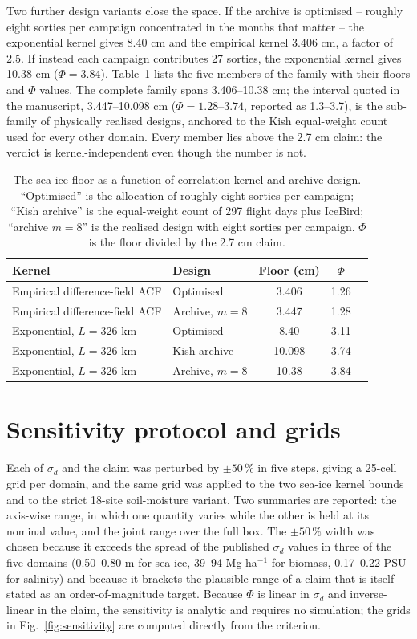 \documentclass[preprint,12pt,authoryear]{elsarticle}
\begin{document}
Two further design variants close the space. If the archive is optimised -- roughly eight sorties per campaign concentrated in the months that matter -- the exponential kernel gives 8.40 cm and the empirical kernel 3.406 cm, a factor of 2.5. If instead each campaign contributes 27 sorties, the exponential kernel gives 10.38 cm ($\Phi = 3.84$). Table~\ref{tab:kernel} lists the five members of the family with their floors and $\Phi$ values. The complete family spans 3.406--10.38 cm; the interval quoted in the manuscript, 3.447--10.098 cm ($\Phi = 1.28$--$3.74$, reported as 1.3--3.7), is the sub-family of physically realised designs, anchored to the Kish equal-weight count used for every other domain. Every member lies above the 2.7 cm claim: the verdict is kernel-independent even though the number is not.

\begin{table}[t]
\caption{The sea-ice floor as a function of correlation kernel and archive design. ``Optimised'' is the allocation of roughly eight sorties per campaign; ``Kish archive'' is the equal-weight count of 297 flight days plus IceBird; ``archive $m = 8$'' is the realised design with eight sorties per campaign. $\Phi$ is the floor divided by the 2.7 cm claim.}
\label{tab:kernel}
\footnotesize
\setlength{\tabcolsep}{4pt}
\begin{tabular}{llccc}
\toprule
Kernel & Design & Floor (cm) & $\Phi$ \\
\midrule
Empirical difference-field ACF & Optimised & 3.406 & 1.26 \\
Empirical difference-field ACF & Archive, $m = 8$ & 3.447 & 1.28 \\
Exponential, $L = 326$ km & Optimised & 8.40 & 3.11 \\
Exponential, $L = 326$ km & Kish archive & 10.098 & 3.74 \\
Exponential, $L = 326$ km & Archive, $m = 8$ & 10.38 & 3.84 \\
\bottomrule
\end{tabular}
\end{table}

\section{Sensitivity protocol and grids}
\label{sec:s4}

Each of $\sigma_d$ and the claim was perturbed by $\pm 50\,\%$ in five steps, giving a 25-cell grid per domain, and the same grid was applied to the two sea-ice kernel bounds and to the strict 18-site soil-moisture variant. Two summaries are reported: the axis-wise range, in which one quantity varies while the other is held at its nominal value, and the joint range over the full box. The $\pm 50\,\%$ width was chosen because it exceeds the spread of the published $\sigma_d$ values in three of the five domains (0.50--0.80 m for sea ice, 39--94 Mg ha$^{-1}$ for biomass, 0.17--0.22 PSU for salinity) and because it brackets the plausible range of a claim that is itself stated as an order-of-magnitude target. Because $\Phi$ is linear in $\sigma_d$ and inverse-linear in the claim, the sensitivity is analytic and requires no simulation; the grids in Fig.~\ref{fig:sensitivity} are computed directly from the criterion.
\end{document}
